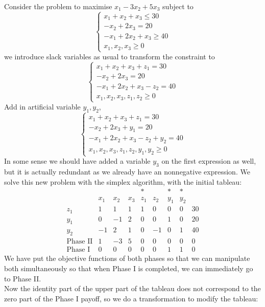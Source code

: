 \begin{example}
    Consider the problem to maximise $x_1-3x_2+5x_3$ subject to
    $$\begin{cases}
        x_1+x_2+x_3\le 30\\
        -x_2+2x_3=20\\
        -x_1+2x_2+x_3\ge 40\\
        x_1,x_2,x_3\ge 0
    \end{cases}$$
    we introduce slack variables as usual to transform the constraint to
    $$\begin{cases}
        x_1+x_2+x_3+z_1=30\\
        -x_2+2x_3=20\\
        -x_1+2x_2+x_3-z_2=40\\
        x_1,x_2,x_3,z_1,z_2\ge 0
    \end{cases}$$
    Add in artificial variable $y_1,y_2$,
    $$\begin{cases}
        x_1+x_2+x_3+z_1=30\\
        -x_2+2x_3+y_1=20\\
        -x_1+2x_2+x_3-z_2+y_2=40\\
        x_1,x_2,x_3,z_1,z_2,y_1,y_2\ge 0
    \end{cases}$$
    In some sense we should have added a variable $y_3$ on the first expression as well, but it is actually redundant as we already have an nonnegative expression.
    We solve this new problem with the simplex algorithm, with the initial tableau:
    $$\begin{array}{c|ccccccc|c}
        &&&&\ast&&\ast&\ast&\\
        &x_1&x_2&x_3&z_1&z_2&y_1&y_2&\\ \hline
        z_1&1&1&1&1&0&0&0&30\\
        y_1&0&-1&2&0&0&1&0&20\\
        y_2&-1&2&1&0&-1&0&1&40\\ \hline
        \text{Phase II}&1&-3&5&0&0&0&0&0\\ \hline
        \text{Phase I}&0&0&0&0&0&1&1&0
    \end{array}$$
    We have put the objective functions of both phases so that we can manipulate both simultaneously so that when Phase I is completed, we can immediately go to Phase II.\\
    Now the identity part of the upper part of the tableau does not correspond to the zero part of the Phase I payoff, so we do a transformation to modify the tableau:
    $$\begin{array}{c|ccccccc|c}

\end{array}$$
\end{example}
